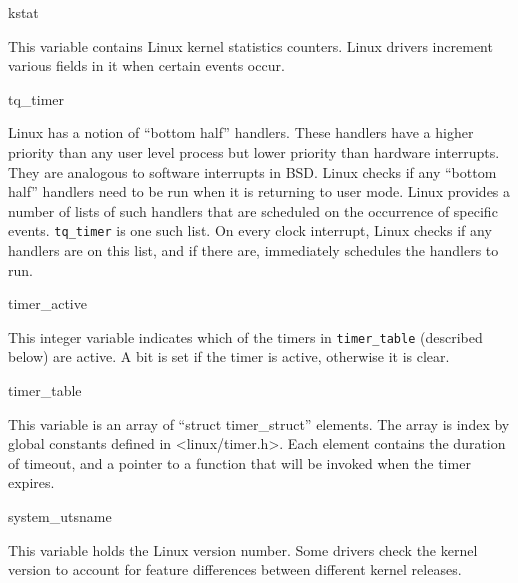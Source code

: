 \begin{icsymlist}
\item[kstat]

This variable contains Linux kernel statistics counters.  Linux
drivers increment various fields in it when certain events occur.

\item[tq_timer]

Linux has a notion of ``bottom half'' handlers.  These handlers have a
higher priority than any user level process but lower priority than
hardware interrupts.  They are analogous to software interrupts in
BSD\@.  Linux checks if any ``bottom half'' handlers need to be run when
it is returning to user mode.  Linux provides a number of lists of
such handlers that are scheduled on the occurrence of specific events.
{\tt tq_timer} is one such list.  On every clock interrupt,
Linux checks if any handlers are on this list, and if there are,
immediately schedules the handlers to run.


\item[timer_active]

This integer variable indicates which of the timers in {\tt timer_table}
(described below) are active.  A bit is set if the timer is active,
otherwise it is clear.

\item[timer_table]

This variable is an array of ``struct timer_struct'' elements.  The
array is index by global constants defined in <linux/timer.h>.  Each
element contains the duration of timeout, and a pointer to a function
that will be invoked when the timer expires.

\item[system_utsname]

This variable holds the Linux version number.  Some drivers check the
kernel version to account for feature differences between different
kernel releases.
\end{icsymlist}

